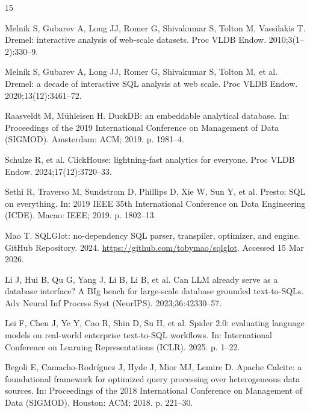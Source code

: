 \documentclass[10pt,a4paper]{article}
\begin{document}
\begin{thebibliography}{15}
\small

Melnik S, Gubarev A, Long JJ, Romer G, Shivakumar S, Tolton M, Vassilakis T. Dremel: interactive analysis of web-scale datasets. Proc VLDB Endow. 2010;3(1--2):330--9.

Melnik S, Gubarev A, Long JJ, Romer G, Shivakumar S, Tolton M, et al. Dremel: a decade of interactive SQL analysis at web scale. Proc VLDB Endow. 2020;13(12):3461--72.

Raasveldt M, M{\"u}hleisen H. DuckDB: an embeddable analytical database. In: Proceedings of the 2019 International Conference on Management of Data (SIGMOD). Amsterdam: ACM; 2019. p. 1981--4.

Schulze R, et al. ClickHouse: lightning-fast analytics for everyone. Proc VLDB Endow. 2024;17(12):3720--33.

Sethi R, Traverso M, Sundstrom D, Phillips D, Xie W, Sun Y, et al. Presto: SQL on everything. In: 2019 IEEE 35th International Conference on Data Engineering (ICDE). Macao: IEEE; 2019. p. 1802--13.

Mao T. SQLGlot: no-dependency SQL parser, transpiler, optimizer, and engine. GitHub Repository. 2024. \url{https://github.com/tobymao/sqlglot}. Accessed 15 Mar 2026.

Li J, Hui B, Qu G, Yang J, Li B, Li B, et al. Can LLM already serve as a database interface? A BIg bench for large-scale database grounded text-to-SQLs. Adv Neural Inf Process Syst (NeurIPS). 2023;36:42330--57.

Lei F, Chen J, Ye Y, Cao R, Shin D, Su H, et al. Spider 2.0: evaluating language models on real-world enterprise text-to-SQL workflows. In: International Conference on Learning Representations (ICLR). 2025. p. 1--22.

Begoli E, Camacho-Rodr{\'i}guez J, Hyde J, Mior MJ, Lemire D. Apache Calcite: a foundational framework for optimized query processing over heterogeneous data sources. In: Proceedings of the 2018 International Conference on Management of Data (SIGMOD). Houston: ACM; 2018. p. 221--30.


\end{thebibliography}
\end{document}
